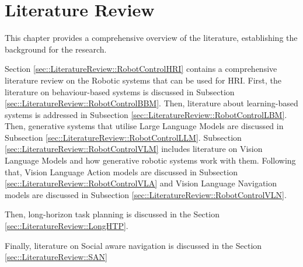 \chapter{Literature Review}
\label{ch::LiteratureReview}

This chapter provides a comprehensive overview of the literature, establishing the background for the research.

Section \ref{sec::LiteratureReview::RobotControlHRI} contains a comprehensive literature review on the Robotic systems that can be used for HRI. First, the literature on behaviour-based systems is discussed in Subsection \ref{sec::LiteratureReview::RobotControlBBM}. Then, literature about learning-based systems is addressed in Subsection \ref{sec::LiteratureReview::RobotControlLBM}. Then, generative systems that utilise Large Language Models are discussed in Subsection \ref{sec::LiteratureReview::RobotControlLLM}. Subsection \ref{sec::LiteratureReview::RobotControlVLM} includes literature on Vision Language Models and how generative robotic systems work with them. Following that, Vision Language Action models are discussed in Subsection \ref{sec::LiteratureReview::RobotControlVLA} and Vision Language Navigation models are discussed in Subsection \ref{sec::LiteratureReview::RobotControlVLN}.

Then, long-horizon task planning is discussed in the Section \ref{sec::LiteratureReview::LongHTP}.

Finally, literature on Social aware navigation is discussed in the Section \ref{sec::LiteratureReview::SAN}